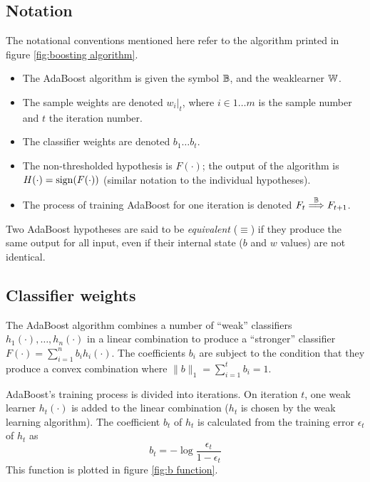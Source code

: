 \subsection{Notation}

The notational conventions mentioned here refer to the algorithm
printed in figure \ref{fig:boosting algorithm}.

\begin{itemize}
\item	The AdaBoost algorithm is given the symbol $\mathbb{B}$, and the
	weaklearner $\mathbb{W}$.
\item	The sample weights are denoted $w_i|_t$, where $i \in 1 \ldots
	m$ is the sample number and $t$ the iteration number.
\item	The classifier weights are denoted $b_1 \ldots b_t$.
\item	The non-thresholded hypothesis is $F(\cdot)$; the output of
	the algorithm is $H(\cdot) = \mathrm{sign}(F(\cdot))$ (similar
	notation to the individual hypotheses).
\item	The process of training AdaBoost for one iteration is denoted
	$F_t \stackrel{\mathbb{B}}{\Longrightarrow} F_{t+1}$.
\end{itemize}

Two AdaBoost hypotheses are said to be \emph{equivalent} ($\equiv$) if
they produce the same output for all input, even if their internal
state ($b$ and $w$ values) are not identical.


\subsection{Classifier weights}
\label{sec:classifier weights}

The AdaBoost algorithm combines a number of ``weak'' classifiers
$h_1(\cdot), \ldots, h_n(\cdot)$ in a linear combination to produce a
``stronger'' classifier $F(\cdot) = \sum_{i=1}^{n} b_i h_i(\cdot)$.
The coefficients $b_i$ are subject to the condition that they produce a
convex combination where $\|b\|_1 = \sum_{i=1}^{t} b_i = 1$.

AdaBoost's training process is divided into iterations.  On iteration
$t$, one weak learner $h_t(\cdot)$ is added to the linear
combination ($h_t$ is chosen by the weak learning algorithm).  The
coefficient $b_t$ of $h_t$ is calculated from the 
training error $\epsilon_t$ of $h_t$ as 
%
\begin{equation}
b_t = - \log \frac{\epsilon_t}{1 - \epsilon_t}
\label{eqn:theory:bt}
\end{equation}
%
This function is plotted in figure \ref{fig:b function}.

